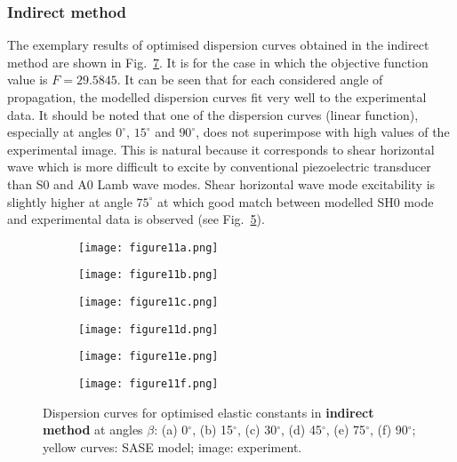 \documentclass[preprint,12pt]{elsarticle}
\begin{document}
\subsubsection{Indirect method}
The exemplary results of optimised dispersion curves obtained in the indirect method 
are shown in Fig.~\ref{fig:optimized}. It is for the case in which the objective function 
value is \(F=29.5845\). It can be seen that for each considered angle of propagation, the 
modelled dispersion curves fit very well to the experimental data. It should be noted that 
one of the dispersion curves (linear function), especially at angles \(0^{\circ}\), 
\(15^{\circ}\) and \(90^{\circ}\), does not superimpose with high values of the 
experimental image. This is natural because it corresponds to shear horizontal wave 
which is more difficult to excite by conventional piezoelectric transducer than S0 and 
A0 Lamb wave modes. Shear horizontal wave mode excitability is slightly higher at 
angle \(75^{\circ}\) at which good match between modelled SH0 mode and experimental 
data is observed (see Fig.~\ref{fig:dispersion75deg}). 

\begin{figure} [h!]
	\centering
	\begin{subfigure}[b]{0.49\textwidth}
		\centering
		\texttt{[image: figure11a.png]}
		\caption{}
		\label{fig:dispersion0deg}
	\end{subfigure}
	\begin{subfigure}[b]{0.49\textwidth}
		\centering
		\texttt{[image: figure11b.png]}
		\caption{}
		\label{fig:dispersion15deg}
	\end{subfigure}
	\begin{subfigure}[b]{0.49\textwidth}
		\centering
		\texttt{[image: figure11c.png]}
		\caption{}
		\label{fig:dispersion30deg}
	\end{subfigure}
	\begin{subfigure}[b]{0.49\textwidth}
		\centering
		\texttt{[image: figure11d.png]}
		\caption{}
		\label{fig:dispersion45deg}
	\end{subfigure}
	\begin{subfigure}[b]{0.49\textwidth}
		\centering
		\texttt{[image: figure11e.png]}
		\caption{}
		\label{fig:dispersion75deg}
	\end{subfigure}
	\begin{subfigure}[b]{0.49\textwidth}
		\centering
		\texttt{[image: figure11f.png]}
		\caption{}
		\label{fig:dispersion90deg}
	\end{subfigure}
	\caption{Dispersion curves for optimised elastic constants in \textbf{indirect method} 
	at angles \(\beta\): (a) 0\(^{\circ}\), (b) 15\(^{\circ}\), (c) 30\(^{\circ}\), (d) 
	45\(^{\circ}\), 
	(e) 75\(^{\circ}\), (f) 90\(^{\circ}\); yellow curves: SASE model; image: experiment. }
	\label{fig:optimized}
\end{figure}
\end{document}
